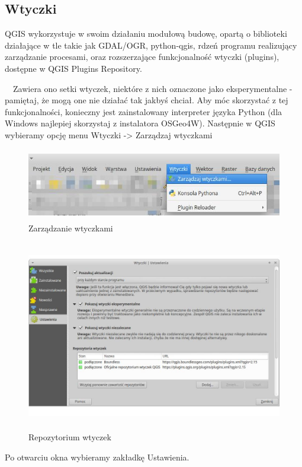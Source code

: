 \documentclass[12pt,a4paper]{book}
\begin{document}
\subsection[Wtyczki]{Wtyczki}
QGIS wykorzystuje w swoim działaniu modułową budowę, opartą o biblioteki działające w tle takie jak GDAL/OGR, python-qgis, rdzeń programu realizujący zarządzanie procesami, oraz rozszerzające funkcjonalność wtyczki (plugins), dostępne w QGIS Plugins Repository.

\ \ Zawiera ono setki wtyczek, niektóre z nich oznaczone jako eksperymentalne - pamiętaj, że mogą one nie działać tak jakbyś chciał. Aby móc skorzystać z tej funkcjonalności, konieczny jest zainstalowany interpreter języka Python (dla Windows najlepiej skorzystaj z instalatora OSGeo4W). Następnie w QGIS wybieramy opcję menu Wtyczki -{\textgreater} Zarządzaj wtyczkami



\begin{center}
\begin{figure}
\includegraphics[width=13cm,height=3.14cm]{002-wtyczki-zarzadzanie.jpg}
\caption{Zarządzanie wtyczkami}
\end{figure}
\end{center}


\begin{center}
\begin{figure}
\includegraphics[width=13.014cm,height=8.311cm]{002-wtyczki-repo.jpg}
\caption{Repozytorium wtyczek}
\end{figure}
\end{center}
Po otwarciu okna wybieramy zakładkę Ustawienia.
\end{document}
